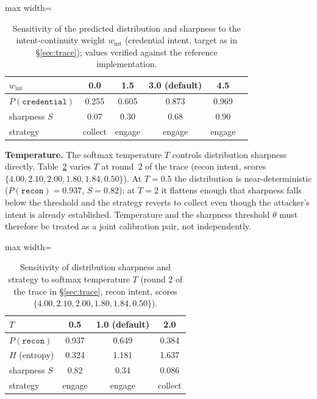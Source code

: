 \documentclass[11pt]{article}
\newcommand{\act}[1]{\texttt{#1}}
\begin{document}
\begin{table}[ht]
\centering
\begin{adjustbox}{max width=\linewidth}\begin{tabular}{@{}lccccc@{}}
\toprule
$w_{\mathrm{int}}$ & 0.0 & 1.5 & 3.0 (default) & 4.5 \\
\midrule
$P(\act{credential})$ & 0.255 & 0.605 & 0.873 & 0.969 \\
sharpness $S$ & 0.07 & 0.30 & 0.68 & 0.90 \\
strategy & collect & engage & engage & engage \\
\bottomrule
\end{tabular}\end{adjustbox}
\caption{Sensitivity of the predicted distribution and sharpness to the
intent-continuity weight $w_{\mathrm{int}}$ (credential intent, target as in
\S\ref{sec:trace}); values verified against the reference implementation.}
\label{tab:sens-int}
\end{table}

\textbf{Temperature.} The softmax temperature $T$ controls distribution
sharpness directly. Table~\ref{tab:sens-temp} varies $T$ at round~2 of the
trace (recon intent, scores $\{4.00, 2.10, 2.00, 1.80, 1.84, 0.50\}$). At
$T=0.5$ the distribution is near-deterministic ($P(\act{recon})=0.937$,
$S=0.82$); at $T=2$ it flattens enough that sharpness falls below the
threshold and the strategy reverts to collect even though the attacker's
intent is already established. Temperature and the sharpness threshold
$\theta$ must therefore be treated as a joint calibration pair, not
independently.

\begin{table}[ht]
\centering
\begin{adjustbox}{max width=\linewidth}\begin{tabular}{@{}lccc@{}}
\toprule
$T$ & 0.5 & 1.0 (default) & 2.0 \\
\midrule
$P(\act{recon})$ & 0.937 & 0.649 & 0.384 \\
$H$ (entropy) & 0.324 & 1.181 & 1.637 \\
sharpness $S$ & 0.82 & 0.34 & 0.086 \\
strategy & engage & engage & collect \\
\bottomrule
\end{tabular}\end{adjustbox}
\caption{Sensitivity of distribution sharpness and strategy to softmax
temperature $T$ (round 2 of the trace in \S\ref{sec:trace}, recon intent,
scores $\{4.00, 2.10, 2.00, 1.80, 1.84, 0.50\}$).}
\label{tab:sens-temp}
\end{table}
\end{document}
